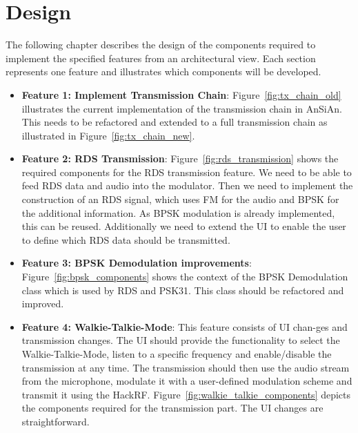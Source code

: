 \chapter{Design}
The following chapter describes the design of the components required to implement the specified features from an architectural view. Each section represents one feature and illustrates which components will be developed. 

\begin{itemize}
	\item \textbf{Feature 1: Implement Transmission Chain}: Figure~\ref{fig:tx_chain_old} illustrates the current implementation of the transmission chain in \ac{AnSiAn}. This needs to be refactored and extended to a full transmission chain as illustrated in Figure~\ref{fig:tx_chain_new}.
	
	\item \textbf{Feature 2: RDS Transmission}: Figure~\ref{fig:rds_transmission} shows the required components for the RDS transmission feature. We need to be able to feed RDS data and audio into the modulator. Then we need to implement the construction of an RDS signal, which uses \ac{FM} for the audio and \ac{BPSK} for the additional information. As BPSK modulation is already implemented, this can be reused. Additionally we need to extend the UI to enable the user to define which RDS data should be transmitted. 
	
	\item \textbf{Feature 3: BPSK Demodulation improvements}: Figure~\ref{fig:bpsk_components} shows the context of the \ac{BPSK} Demodulation class which is used by \ac{RDS} and PSK31. This class should be refactored and improved.
	
	\item \textbf{Feature 4: Walkie-Talkie-Mode}: This feature consists of UI chan-ges and transmission changes. The UI should provide the functionality to select the Walkie-Talkie-Mode, listen to a specific frequency and enable/disable the transmission at any time. The transmission should then use the audio stream from the microphone, modulate it with a user-defined modulation scheme and transmit it using the HackRF. Figure~\ref{fig:walkie_talkie_components} depicts the components required for the transmission part. The UI changes are straightforward.
\end{itemize}


